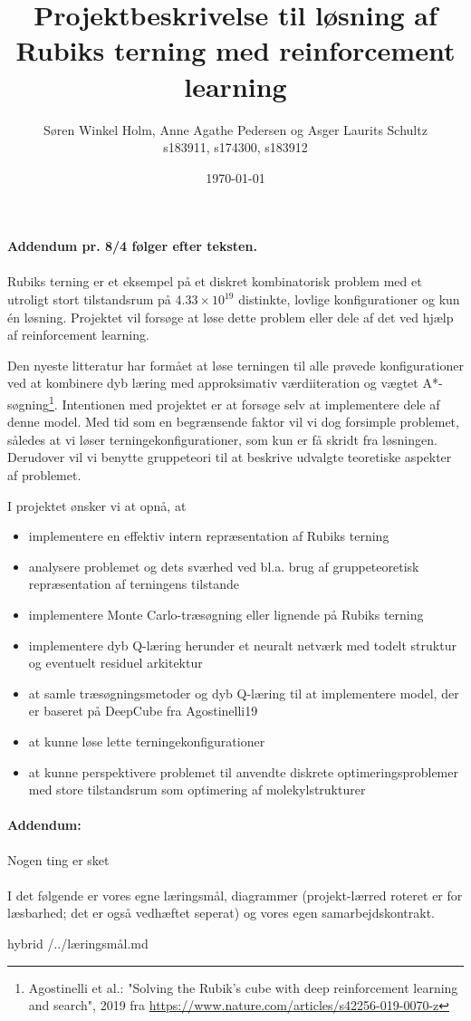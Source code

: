 \documentclass[12pt,fleqn,]{article}
\title{Projektbeskrivelse til løsning af Rubiks terning med reinforcement learning}
\author{Søren Winkel Holm, Anne Agathe Pedersen og Asger Laurits Schultz\\
s183911, s174300, s183912}
\date{\today}
\begin{document}
\maketitle
\noindent
\textbf{Addendum pr. 8/4 følger efter teksten.}
\\
\\
Rubiks terning er et eksempel på et diskret kombinatorisk problem med et utroligt stort tilstandsrum på $4.33\times 10^{19}$ distinkte, lovlige konfigurationer og kun én løsning. 
Projektet vil forsøge at løse dette problem eller dele af det ved hjælp af reinforcement learning. 

Den nyeste litteratur har formået at løse terningen til alle prøvede konfigurationer ved at kombinere dyb læring med approksimativ værdiiteration og vægtet A*-søgning\footnote{Agostinelli et al.: "Solving the Rubik’s cube with deep reinforcement learning and search", 2019 fra
	\url{https://www.nature.com/articles/s42256-019-0070-z}
}.
Intentionen med projektet er at forsøge selv at implementere dele af denne model. 
Med tid som en begrænsende faktor vil vi dog forsimple problemet, således at vi løser terningekonfigurationer, som kun er få skridt fra løsningen.
Derudover vil vi benytte gruppeteori til at beskrive udvalgte teoretiske aspekter af problemet.

I projektet ønsker vi at opnå, at
\begin{itemize}
	\item implementere en effektiv intern repræsentation af Rubiks terning
	\item analysere problemet og dets sværhed ved bl.a. brug af gruppeteoretisk repræsentation af terningens tilstande
	\item implementere Monte Carlo-træsøgning eller lignende på Rubiks terning
	\item implementere dyb Q-læring herunder et neuralt netværk med todelt struktur og eventuelt residuel arkitektur
	\item at samle træsøgningsmetoder og dyb Q-læring til at implementere model, der er baseret på DeepCube fra Agostinelli19
	\item at kunne løse lette terningekonfigurationer
	\item at kunne perspektivere problemet til anvendte diskrete optimeringsproblemer med store tilstandsrum som optimering af molekylstrukturer
\end{itemize}
\paragraph{Addendum:}
Nogen ting er sket
\\
\\
I det følgende er vores egne læringsmål, diagrammer (projekt-lærred roteret er for læsbarhed; det er også vedhæftet seperat) og vores egen samarbejdskontrakt.
\newpage
\begin{markdown*}{hybrid}
/../læringsmål.md
\end{markdown*}
\end{document}
